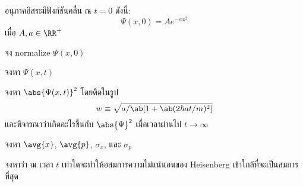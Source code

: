\begin{exbox}
    อนุภาคอิสระมีฟังก์ชันคลื่น ณ $t = 0$ ดังนี้:
    \begin{equation}
        \Psi(x, 0) = Ae^{-ax^2} \tag{$\star$}
    \end{equation}
    เมื่อ $A, a \in \RR^+$
    \begin{compactenum}[label=(\alph*)]
        \item จง normalize $\Psi(x, 0)$
        \item จงหา $\Psi(x, t)$
        \item จงหา $\abs{\Psi(x, t)}^2$ โดยติดในรูป
        \[
            w \equiv \sqrt{a/\ab[1 + \ab(2\hbar at/m)^2]}
        \]
        และพิจารณาว่าเกิดอะไรขึ้นกับ $\abs{\Psi}^2$ เมื่อเวลาผ่านไป $t\to\infty$
        \item จงหา $\avg{x}$, $\avg{p}$, $\sigma_x$, และ $\sigma_p$
        \item จงหาว่า ณ เวลา $t$ เท่าใดจะทำให้อสมการความไม่แน่นอนของ Heisenberg เข้าใกล้ที่จะเป็นสมการที่สุด
    \end{compactenum}
\end{exbox}
